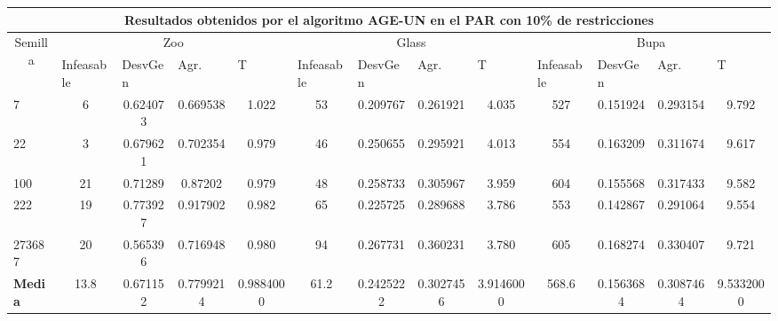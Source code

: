 \begin{table}[H]
	\tiny

	\begin{adjustwidth}{-1cm}{-1cm}%
	
	\begin{tabular}{|l|c|c|c|c|c|c|c|c|c|c|c|c|}
	\hline
	\multicolumn{13}{|c|}{\textbf{Resultados obtenidos por el algoritmo AGE-UN en el PAR con 10\% de restricciones}}                                                                                                                                                                                                                                                                                                                                            \\ \hline
	\multicolumn{1}{|c|}{\multirow{2}{*}{Semilla}} & \multicolumn{4}{c|}{Zoo}                                                                                          & \multicolumn{4}{c|}{Glass}                                                                                         & \multicolumn{4}{c|}{Bupa}                                                                                          \\ \cline{2-13} 
	\multicolumn{1}{|c|}{}                                  & \multicolumn{1}{l|}{Infeasable} & \multicolumn{1}{l|}{DesvGen} & \multicolumn{1}{l|}{Agr.} & \multicolumn{1}{l|}{T} & \multicolumn{1}{l|}{Infeasable} & \multicolumn{1}{l|}{DesvGen} & \multicolumn{1}{l|}{Agr.} & \multicolumn{1}{l|}{T} & \multicolumn{1}{l|}{Infeasable} & \multicolumn{1}{l|}{DesvGen} & \multicolumn{1}{l|}{Agr.} & \multicolumn{1}{l|}{T} \\ \hline
	7   	& 6 & 0.624073 & 0.669538 & 1.022 &  				53 & 0.209767 & 0.261921 & 4.035 &			 	527 & 0.151924 & 0.293154 & 9.792 		\\ \hline
	22 		& 3 & 0.679621 & 0.702354 &	0.979 & 				46 & 0.250655 & 0.295921 & 4.013	&		 	554 & 0.163209 & 0.311674 &	9.617		\\ \hline
	100 	& 21 & 0.71289 & 0.87202 &	0.979 & 				48 & 0.258733 & 0.305967 & 	3.959	&		604 & 0.155568 & 0.317433 &	9.582		\\ \hline
	222 	& 19 & 0.773927 & 0.917902 & 0.982 &				65 & 0.225725 & 0.289688 & 3.786	 &			553 & 0.142867 & 0.291064 &	9.554		\\ \hline
	273687 	& 20 & 0.565396 & 0.716948 &	0.980 &				94 & 0.267731 & 0.360231 & 	3.780		&	605 & 0.168274 & 0.330407 &	9.721		\\ \hline
	\textbf{Media} &  13.8 & 	0.671152 & 	0.7799214 & 	0.9884000 & 	61.2 & 	0.2425222 & 	0.3027456 & 	3.9146000 & 	568.6 & 	0.1563684 & 	0.3087464 & 	9.5332000   \\ \hline
	\end{tabular}
	
	\end{adjustwidth}
	
\end{table}

